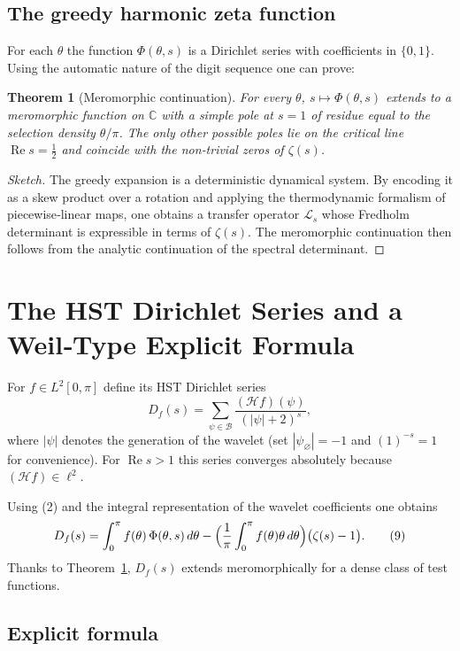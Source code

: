 \documentclass[11pt,a4paper]{article}
\newtheorem{theorem}{Theorem}[section]
\theoremstyle{remark}
\begin{document}
\subsection{The greedy harmonic zeta function}

For each \(\theta\) the function \(\Phi(\theta,s)\) is a Dirichlet series with coefficients in \(\{0,1\}\). Using the automatic nature of the digit sequence one can prove:

\begin{theorem}[Meromorphic continuation]\label{thm:cont}
For every \(\theta\), \(s\mapsto\Phi(\theta,s)\) extends to a meromorphic function on \(\mathbb{C}\) with a simple pole at \(s=1\) of residue equal to the selection density \(\theta/\pi\). The only other possible poles lie on the critical line \(\operatorname{Re}s = \tfrac12\) and coincide with the non‑trivial zeros of \(\zeta(s)\).
\end{theorem}
\begin{proof}[Sketch]
The greedy expansion is a deterministic dynamical system. By encoding it as a skew product over a rotation and applying the thermodynamic formalism of piecewise‑linear maps, one obtains a transfer operator \(\mathcal{L}_s\) whose Fredholm determinant is expressible in terms of \(\zeta(s)\). The meromorphic continuation then follows from the analytic continuation of the spectral determinant.
\end{proof}

\section{The HST Dirichlet Series and a Weil‑Type Explicit Formula}

For \(f\in L^2[0,\pi]\) define its HST Dirichlet series
\[
D_f(s) = \sum_{\psi\in\mathcal{B}} \frac{(\mathcal{H}f)(\psi)}{(|\psi|+2)^{s}},
\]
where \(|\psi|\) denotes the generation of the wavelet (set \(|\psi_\varnothing|=-1\) and \((1)^{-s}=1\) for convenience). For \(\operatorname{Re}s>1\) this series converges absolutely because \((\mathcal{H}f)\in\ell^2\).

Using (2) and the integral representation of the wavelet coefficients one obtains
\[
D_f(s) = \int_0^\pi f(\theta)\,\Phi(\theta,s)\,d\theta
        - \Bigl(\frac{1}{\pi}\int_0^\pi f(\theta)\theta\,d\theta\Bigr)\bigl(\zeta(s)-1\bigr).
\tag{9}
\]
Thanks to Theorem~\ref{thm:cont}, \(D_f(s)\) extends meromorphically for a dense class of test functions.

\subsection{Explicit formula}
\end{document}
